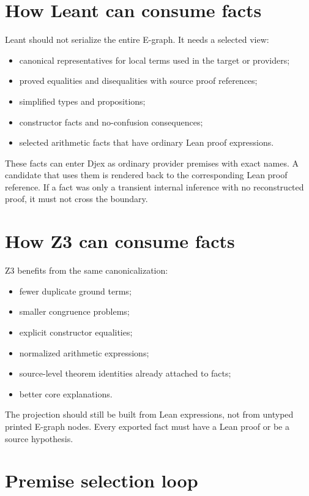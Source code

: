 \documentclass[11pt,letterpaper,openany]{report}
\newcommand{\code}[1]{\texttt{\detokenize{#1}}}
\begin{document}
\section{How Leant can consume \code{grind} facts}

Leant should not serialize the entire E-graph. It needs a selected view:

\begin{itemize}
  \item canonical representatives for local terms used in the target or providers;
  \item proved equalities and disequalities with source proof references;
  \item simplified types and propositions;
  \item constructor facts and no-confusion consequences;
  \item selected arithmetic facts that have ordinary Lean proof expressions.
\end{itemize}

These facts can enter Djex as ordinary provider premises with exact names. A candidate
that uses them is rendered back to the corresponding Lean proof reference. If a fact
was only a transient internal inference with no reconstructed proof, it must not cross
the boundary.

\section{How Z3 can consume \code{grind} facts}

Z3 benefits from the same canonicalization:

\begin{itemize}
  \item fewer duplicate ground terms;
  \item smaller congruence problems;
  \item explicit constructor equalities;
  \item normalized arithmetic expressions;
  \item source-level theorem identities already attached to facts;
  \item better core explanations.
\end{itemize}

The projection should still be built from Lean expressions, not from untyped printed
E-graph nodes. Every exported fact must have a Lean proof or be a source hypothesis.

\section{Premise selection loop}
\end{document}

